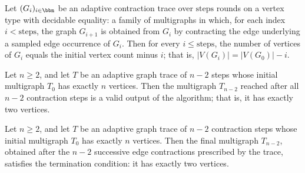 \begin{lemma}
\label{KargerTrace.kargerGraphTrace_vertexCount_eq}
\leanok
{}
Let $(G_i)_{i \in \bbn}$ be an adaptive contraction trace over $\text{steps}$ rounds on
a vertex type with decidable equality: a family of multigraphs in which, for each index
$i < \text{steps}$, the graph $G_{i+1}$ is obtained from $G_i$ by contracting the edge
underlying a sampled edge occurrence of $G_i$. Then for every $i \le \text{steps}$, the
number of vertices of $G_i$ equals the initial vertex count minus $i$; that is, $\lvert
V(G_i)\rvert = \lvert V(G_0)\rvert - i$.
\end{lemma}

\begin{lemma}
\label{KargerTrace.kargerGraphTrace_full_output}
\leanok
{}
Let $n \ge 2$, and let $T$ be an adaptive graph trace of $n-2$ steps whose initial
multigraph $T_0$ has exactly $n$ vertices. Then the multigraph $T_{n-2}$ reached after
all $n-2$ contraction steps is a valid output of the algorithm; that is, it has exactly
two vertices.
\end{lemma}

\begin{theorem}
\label{KargerTrace.adaptive_karger_trace_outputs_two_vertices}
\leanok
{}
Let $n \ge 2$, and let $T$ be an adaptive graph trace of $n-2$ contraction steps whose
initial multigraph $T_0$ has exactly $n$ vertices. Then the final multigraph $T_{n-2}$,
obtained after the $n-2$ successive edge contractions prescribed by the trace, satisfies
the termination condition: it has exactly two vertices.
\end{theorem}

